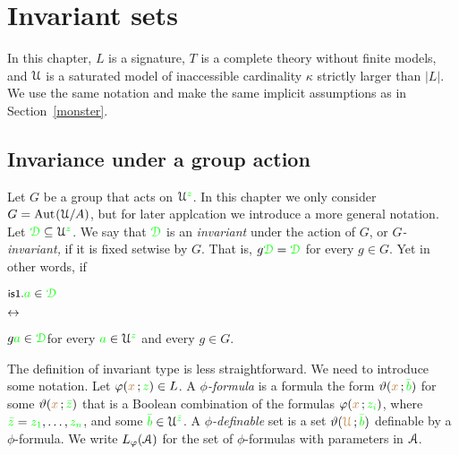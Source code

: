 \chapter{Invariant sets}
\label{invariant}

\def\medrel#1{\parbox[t]{6ex}{$\displaystyle\hfil #1$}}
\def\ceq#1#2#3{\parbox[t]{16ex}{$\displaystyle #1$}\medrel{#2}{$\displaystyle #3$}}

In this chapter, $L$ is a signature, $T$ is a complete theory without finite models, and $\EuScript U$ is a saturated model of inaccessible cardinality $\kappa$ strictly larger than $|L|$.
We use the same notation and make the same implicit assumptions as in Section~\ref{monster}.

\section{Invariance under a group action}\label{invariant_sets}

Let $G$ be a group that acts on $\EuScript U^{\color{green} z}$.
In this chapter we only consider $G={\rm Aut\kern.15ex}(\EuScript U/A)$, but for later applcation we introduce a more general notation.
Let ${\color{green}\EuScript D}\subseteq\EuScript U^{\color{green} z}$.
We say that ${\color{green}\EuScript D}$ is an \emph{invariant\/} under the action of $G$, or \emph{$G$-invariant,} if it is fixed setwise by $G$.
That is, $g{\color{green}\EuScript D}={\color{green}\EuScript D}$ for every $g\in G$.
Yet in other words, if

\ceq{\ssf{is1.}\hfill {\gr a}\in\grD}{\iff}{g{\gr a}\in\grD}\hfill for every ${\color{green} a}\in\EuScript U^{\color{green} z}$ and every $g\in G$.



The definition of invariant type is less straightforward.
We need to introduce some notation.
Let $\varphi({\color{brown} x}\,;{\color{green} z})\in L$.
A \emph{$\phi$-formula\/} is a formula the form $\vartheta({\color{brown} x}\,;{\color{green}\bar b})$ for some $\vartheta({\color{brown} x}\,;{\color{green}\bar z})$ that is a Boolean combination of the formulas $\varphi({\color{brown} x}\,;{\color{green} z_i})$, where ${\color{green}\bar z}={\color{green} z_1},\dots,{\color{green} z_n}$, and some ${\color{green}\bar b}\in\EuScript U^{\color{green}\bar z}$.
A \emph{$\phi$-definable\/} set is a set  $\vartheta({\color{brown}\EuScript U}\,;{\color{green}\bar b})$ definable by a $\phi$-formula.
We write $L_\varphi(\EuScript A)$ for the set of $\phi$-formulas with parameters in $\EuScript A$.

